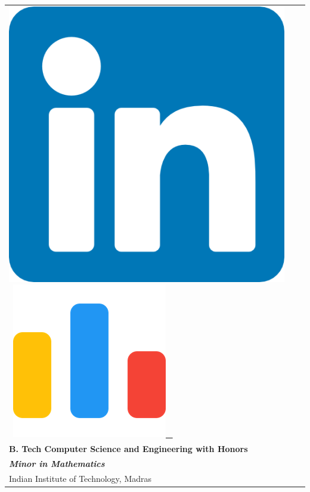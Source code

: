 \documentclass[10pt,article]{article}
\begin{document}
\begin{table}
\begin{minipage}{0.9\linewidth}
\begin{tabular}{l l r}
{{ \href{https://www.linkedin.com/in/snehadeep-gayen/}{\includegraphics[scale=0.05]{linkedin.png}} \ \href{https://codeforces.com/profile/Snehadeep}{\includegraphics[scale=0.06]{cf.png} \ } 
            }}
            \\
            \textbf{B. Tech Computer Science and Engineering with Honors}
            \\
            {\textbf{\textit{Minor in Mathematics}}} 
            \\
            {Indian Institute of Technology, Madras} 
            \\
        \end{tabular}
    \end{minipage}\hfill
\end{table}
\end{document}
